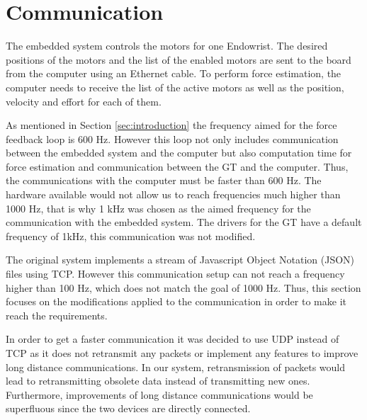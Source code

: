 \section{Communication}
The embedded system controls the motors for one Endowrist. The desired positions of the motors and the list of the enabled motors are sent to the board from the computer using an Ethernet cable. To perform force estimation, the computer needs to receive the list of the active motors as well as the position, velocity and effort for each of them.

As mentioned in Section \ref{sec:introduction} the frequency aimed for the force feedback loop is 600 Hz. However this loop not only includes communication between the embedded system and the computer but also computation time for force estimation and communication between the GT and the computer. Thus, the communications with the computer must be faster than 600 Hz. The hardware available would not allow us to reach frequencies much higher than 1000 Hz, that is why 1 kHz was chosen as the aimed frequency for the communication with the embedded system. The drivers for the GT have a default frequency of 1kHz, this communication was not modified.


The original system implements a stream of Javascript Object Notation (JSON)\cite{JSON_IETF} files using TCP. However this communication setup can not reach a frequency higher than 100 Hz, which does not match the goal of 1000 Hz. Thus, this section focuses on the modifications applied to the communication in order to make it reach the requirements.
 
In order to get a faster communication it was decided to use UDP instead of TCP as it does not retransmit any packets or implement any features to improve long distance communications. In our system, retransmission of packets would lead to retransmitting obsolete data instead of transmitting new ones. Furthermore, improvements of long distance communications would be superfluous since the two devices are directly connected.

